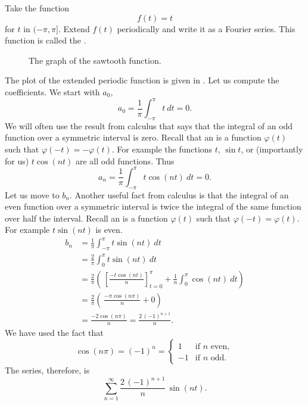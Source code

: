 \documentclass[12pt]{book}
\begin{document}
\begin{example}
Take the function
\begin{equation*}
f(t) = t
\end{equation*}
for $t$ in $(-\pi,\pi]$.  Extend $f(t)$ periodically and write it 
as a Fourier series.  This function is called the \emph{}.

\begin{figure}[h!t]
\capstart
\begin{center}
\caption{The graph of the sawtooth function.\label{ts:sawtoothfig}}
\end{center}
\end{figure}

The plot of the extended periodic function is given in
.
Let us compute the coefficients.  We start with $a_0$,
\begin{equation*}
a_0 = \frac{1}{\pi} \int_{-\pi}^\pi t ~dt = 0 .
\end{equation*}
We will often use the result from calculus that says that the integral of an odd
function over a symmetric interval is zero.  Recall that an
\emph{} is a
function $\varphi(t)$ such that $\varphi(-t) = -\varphi(t)$.  For example
the functions $t$, $\sin t$, or (importantly for us)
$t \cos (nt)$ are all odd functions.  Thus
\begin{equation*}
a_n = \frac{1}{\pi} \int_{-\pi}^\pi t \cos (nt) ~dt = 0 .
\end{equation*}
Let us move to $b_n$.  Another useful fact from calculus
is that the integral of an even function over
a symmetric interval is
twice the integral of the same function over half the interval.  
Recall an \emph{}
is a
function $\varphi(t)$ such that $\varphi(-t) = \varphi(t)$.  For example
$t \sin (nt)$ is even.
\begin{equation*}
\begin{split}
b_n & = \frac{1}{\pi} \int_{-\pi}^\pi t \sin (nt) ~dt \\
& = \frac{2}{\pi} \int_{0}^\pi t \sin (nt) ~dt \\
& = \frac{2}{\pi} \left(
\,
\left[ \frac{-t \cos (nt)}{n} \right]_{t=0}^{\pi}
+
\frac{1}{n}
\int_{0}^\pi \cos (nt) ~dt
\right)
\\
& = \frac{2}{\pi} \left(
\,
\frac{-\pi \cos (n\pi)}{n}
+
0
\right) \\
& =  \frac{-2 \cos (n\pi)}{n}
=  \frac{2 \,{(-1)}^{n+1}}{n} .
\end{split}
\end{equation*}
We have used the fact that 
\begin{equation*}
\cos (n\pi) = {(-1)}^n =
\begin{cases}
1 & \text{if } n \text{ even} , \\
-1 & \text{if } n \text{ odd} .
\end{cases}
\end{equation*}
The series, therefore, is
\begin{equation*}
\sum_{n=1}^\infty
\frac{2 \,{(-1)}^{n+1}}{n} \,
\sin (n t) .
\end{equation*}


\end{example}
\end{document}
